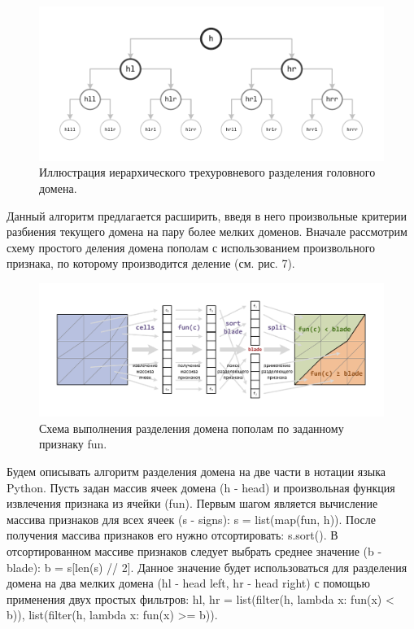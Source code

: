 \begin{figure}[ht]
	\centering
		\includegraphics[width=1.0\textwidth]{./pics/text_2_decompsurf/hierarchical.pdf}
	\caption{Иллюстрация иерархического трехуровневого разделения головного домена.}
	\label{fig:text_2_decompsurf_hierarchical}
\end{figure}

Данный алгоритм предлагается расширить, введя в него произвольные критерии разбиения текущего домена на пару более мелких доменов.
Вначале рассмотрим схему простого деления домена пополам с использованием произвольного признака, по которому производится деление (см. рис. 7).

\begin{figure}[ht]
	\centering
		\includegraphics[width=1.0\textwidth]{./pics/text_2_decompsurf/split.pdf}
	\caption{Схема выполнения разделения домена пополам по заданному признаку fun.}
	\label{fig:text_2_decompsurf_split}
\end{figure}

Будем описывать алгоритм разделения домена на две части в нотации языка Python.
Пусть задан массив ячеек домена (h - head) и произвольная функция извлечения признака из ячейки (fun).
Первым шагом является вычисление массива признаков для всех ячеек (s - signs): s = list(map(fun, h)).
После получения массива признаков его нужно отсортировать: s.sort().
В отсортированном массиве признаков следует выбрать среднее значение (b - blade): b = s[len(s) // 2].
Данное значение будет использоваться для разделения домена на два мелких домена (hl - head left, hr - head right) с помощью применения двух простых фильтров: hl, hr = list(filter(h, lambda x: fun(x) < b)), list(filter(h, lambda x: fun(x) >= b)).

